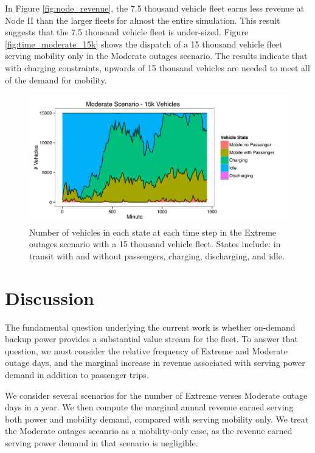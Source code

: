 \documentclass[journal]{IEEEtran}
\begin{document}
In Figure \ref{fig:node_revenue}, the 7.5 thousand vehicle fleet earns less revenue at Node II than the larger fleets for almost the entire simulation. This result suggests that the 7.5 thousand vehicle fleet is under-sized. Figure \ref{fig:time_moderate_15k} shows the dispatch of a 15 thousand vehicle fleet serving mobility only in the Moderate outages scenario. The results indicate that with charging constraints, upwards of 15 thousand vehicles are needed to meet all of the demand for mobility.

\begin{figure}[!htbp]
  \includegraphics[width=\linewidth]{plots/states-area-moderate-15k.pdf}
  \caption{Number of vehicles in each state at each time step in the Extreme outages scenario with a 15 thousand vehicle fleet. States include: in transit with and without passengers, charging, discharging, and idle.}
  \label{fig:time_extreme_15k}
\end{figure}

\section{Discussion}

The fundamental question underlying the current work is whether on-demand backup power provides a substantial value stream for the fleet. To answer that question, we must consider the relative frequency of Extreme and Moderate outage days, and the marginal increase in revenue associated with serving power demand in addition to passenger trips.

We consider several scenarios for the number of Extreme verses Moderate outage days in a year. We then compute the marginal annual revenue earned serving both power and mobility demand, compared with serving mobility only. We treat the Moderate outages sceanrio as a mobility-only case, as the revenue earned serving power demand in that scenario is negligible. 
\end{document}
